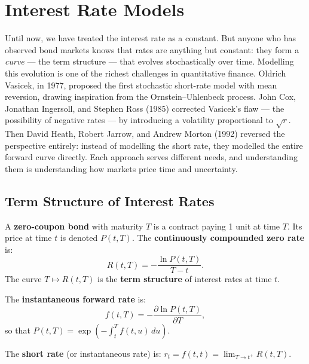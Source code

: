 \chapter{Interest Rate Models}
\label{ch:interest_rates}

Until now, we have treated the interest rate as a constant. But anyone who has observed bond markets knows that rates are anything but constant: they form a \emph{curve} --- the term structure --- that evolves stochastically over time. Modelling this evolution is one of the richest challenges in quantitative finance. Oldrich Vasicek, in 1977, proposed the first stochastic short-rate model with mean reversion, drawing inspiration from the Ornstein--Uhlenbeck process. John Cox, Jonathan Ingersoll, and Stephen Ross (1985) corrected Vasicek's flaw --- the possibility of negative rates --- by introducing a volatility proportional to $\sqrt{r}$. Then David Heath, Robert Jarrow, and Andrew Morton (1992) reversed the perspective entirely: instead of modelling the short rate, they modelled the entire forward curve directly. Each approach serves different needs, and understanding them is understanding how markets price time and uncertainty.

\section{Term Structure of Interest Rates}

\begin{definition}
A \textbf{zero-coupon bond} with maturity $T$ is a contract paying 1 unit
at time $T$. Its price at time $t$ is denoted $P(t,T)$. The
\textbf{continuously compounded zero rate} is:
\[
    R(t,T) = -\frac{\ln P(t,T)}{T - t}.
\]
The curve $T \mapsto R(t,T)$ is the \textbf{term structure} of interest
rates at time $t$.
\end{definition}

\begin{definition}
The \textbf{instantaneous forward rate} is:
\[
    f(t,T) = -\frac{\partial \ln P(t,T)}{\partial T},
\]
so that $P(t,T) = \exp\!\left(-\int_t^T f(t,u)\,du\right)$.
\end{definition}

\begin{definition}
The \textbf{short rate} (or instantaneous rate) is:
$r_t = f(t,t) = \lim_{T \to t^+} R(t,T)$.
\end{definition}

